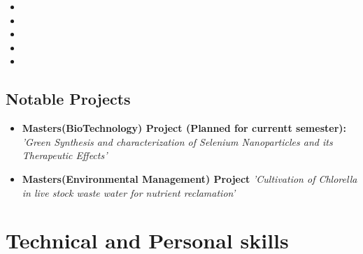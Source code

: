 \documentclass[11pt,a4paper,sans]{moderncv}
\begin{document}
\begin{itemize}

\item{}

\item{}

\item{}  %

\item{}
\item{}
\end{itemize}

\vspace{2pt}

\subsection{Notable Projects}

\vspace{5pt}

\begin{itemize}

\item{\textbf{Masters(BioTechnology) Project (Planned for currentt semester):} \textit{'Green Synthesis and characterization of Selenium Nanoparticles and its Therapeutic Effects'}

\vspace{3pt}

\small{}}

\vspace{3pt}

\item{\textbf{Masters(Environmental Management) Project} \textit{'Cultivation of Chlorella in live stock waste water for nutrient reclamation'}

\vspace{3pt}

\small{}}




\end{itemize}

\section{Technical and Personal skills}
\end{document}
